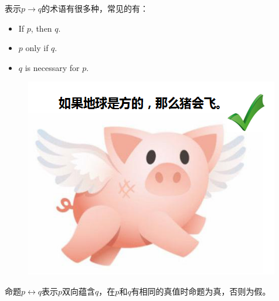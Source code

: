\begin{table}[H]
    \centering
    \caption{蕴含真值表}
\end{table}

表示$ p \rightarrow q $的术语有很多种，常见的有：

\begin{itemize}
    \item If $ p $, then $ q $.
    \item $ p $ only if $ q $.
    \item $ q $ is necessary for $ p $.
\end{itemize}

\begin{figure}[H]
    \centering
    \includegraphics[scale=0.7]{img/C4/4-1/1.png}
\end{figure}

命题$ p \leftrightarrow q $表示$ p $双向蕴含$ q $，在$ p $和$ q $有相同的真值时命题为真，否则为假。

